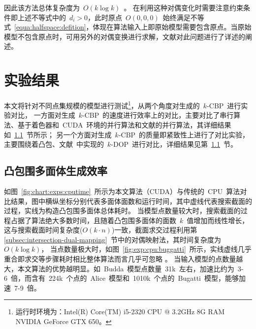 因此该方法总体复杂度为~$O(k\log k)$~。
在利用这种对偶变化时需要注意约束条件即上述不等式中的~$d_i>0$，此时原点~$O(0,0,0)$~始终满足不等式~\ref{equa:halfspace:defition}，体现在算法输入上即原始模型需要包含原点。当原始模型不包含原点时，可用另外的对偶变换进行求解，文献对此问题进行了详述的阐述。

\section{实验结果}
\label{sec:exper-kcbp}

本文将针对不同点集规模的模型进行测试\footnote{运行时环境为：Intel(R) Core(TM)
i5-2320 CPU @ 3.2GHz 8G RAM NVIDIA GeForce GTX
650。}，从两个角度对生成的~$k$-CBP~进行实验对比，
一方面对生成~$k$-CBP~的速度进行效率上的对比，主要对比了串行算法、基于着色器和~CUDA~环境的并行算法和文献的并行算法，其详细结果如~\ref{subsec:exper:efficiency}~节所示；
另一个方面对生成~$k$-CBP~的质量即紧致性上进行了对比实验，主要围绕着凸包、文献~中实现的~$k$-DOP~进行对比，详细结果见第~\ref{subsec:exper:efficiency}~节。

\subsection{凸包围多面体生成效率}
\label{subsec:exper:efficiency}

如图~\ref{fig:chart:exps:cputime}~所示为本文算法（CUDA）与传统的~CPU~算法对比结果，图中横纵坐标分别代表多面体面数和运行时间，其中虚线代表搜索截面的过程，实线为构造凸包围多面体总体耗时。
当模型点数量较大时，搜索截面的过程占据了算法绝大多数时间，且随着凸包围多面体的面数~$k$~值增加而线性增长，这与搜索截面时间复杂度($O(k\cdot
n)$)一致，截面求交过程利用第\ref{subsec:intersection-dual-mapping}~节中的对偶映射法，其时间复杂度为$O(k\log k)$，
当点数量极大时，如图~\ref{fig:exp:cpu:buggatti}~所示，实线虚线几乎重合即求交等步骤耗时相比整体算法而言几乎可忽略
。
当输入模型的点数量越大，本文算法的优势越明显。如~Budda~模型点数量~31k~左右，加速比约为~3-6~倍，而含有~224k~个点的~Alice~模型和~1010k~个点的~Bugatti~模型，能够加速~7-9~倍。

